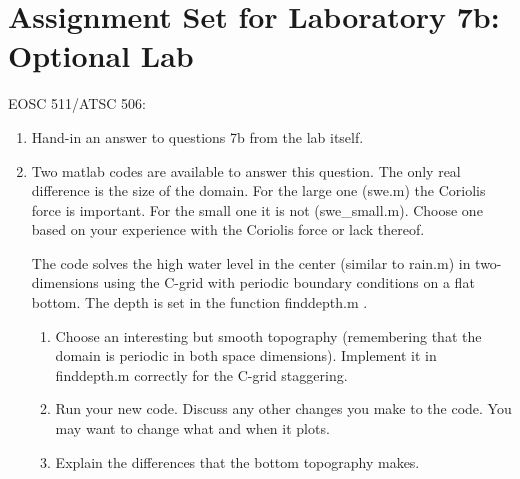 \documentclass[12pt]{article}
\begin{document}
\section*{Assignment Set for Laboratory 7b: Optional Lab}

EOSC 511/ATSC 506: 

\begin{enumerate}
\item Hand-in an answer to questions 7b from the lab itself.

\item Two matlab codes are available to answer this question.  The only real difference is the size of the domain.  For the large one (swe.m) the Coriolis force is important.  For the small one it is not (swe\_small.m).  Choose one based on your experience with the Coriolis force or lack thereof.

The code solves the high water level in the center (similar to rain.m) in two-dimensions using the C-grid with periodic boundary conditions on a flat bottom.  The depth is set in the function finddepth.m .  
\begin{enumerate}
\item Choose an interesting but smooth topography (remembering that the domain is periodic in both space dimensions).  Implement it in finddepth.m correctly for the C-grid staggering.  
\item Run your new code. Discuss any other changes you make to the code. You may want to change what and when it plots.
\item Explain the differences that the bottom topography makes.
\end{enumerate}

\end{enumerate}
\end{document}
